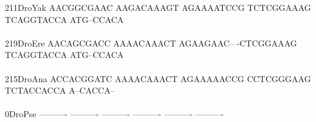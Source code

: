 \documentclass[11pt,twoside,reqno,a4paper]{article}
\begin{document}
{211\hspace*{2\charwidth}DroYak	AACGGCGAAC	AAGACAAAGT	AGAAAATCCG	TCTCGGAAAG	TCAGGTACCA	ATG--CCACA	\\
\hspace*{5\charwidth}\hspace*{7\charwidth}\hspace*{1\charwidth}\hspace*{1\charwidth}\hspace*{1\charwidth}\hspace*{1\charwidth}\hspace*{1\charwidth}\hspace*{1\charwidth}\\
219\hspace*{2\charwidth}DroEre	AACAGCGACC	AAAACAAACT	AGAAGAAC--	-CTCGGAAAG	TCAGGTACCA	ATG--CCACA	\\
\hspace*{5\charwidth}\hspace*{7\charwidth}\hspace*{1\charwidth}\hspace*{1\charwidth}\hspace*{1\charwidth}\hspace*{1\charwidth}\hspace*{1\charwidth}\hspace*{1\charwidth}\\
215\hspace*{2\charwidth}DroAna	ACCACGGATC	AAAACAAACT	AGAAAAACCG	CCTCGGGAAG	TCTACCACCA	A--CACCA--	\\
\hspace*{5\charwidth}\hspace*{7\charwidth}\hspace*{1\charwidth}\hspace*{1\charwidth}\hspace*{1\charwidth}\hspace*{1\charwidth}\hspace*{1\charwidth}\hspace*{1\charwidth}\\
0\hspace*{4\charwidth}DroPse	----------	----------	----------	----------	----------	----------	\\
\hspace*{5\charwidth}\hspace*{7\charwidth}\hspace*{1\charwidth}\hspace*{1\charwidth}\hspace*{1\charwidth}\hspace*{1\charwidth}\hspace*{1\charwidth}\hspace*{1\charwidth}\\
}
\end{document}

